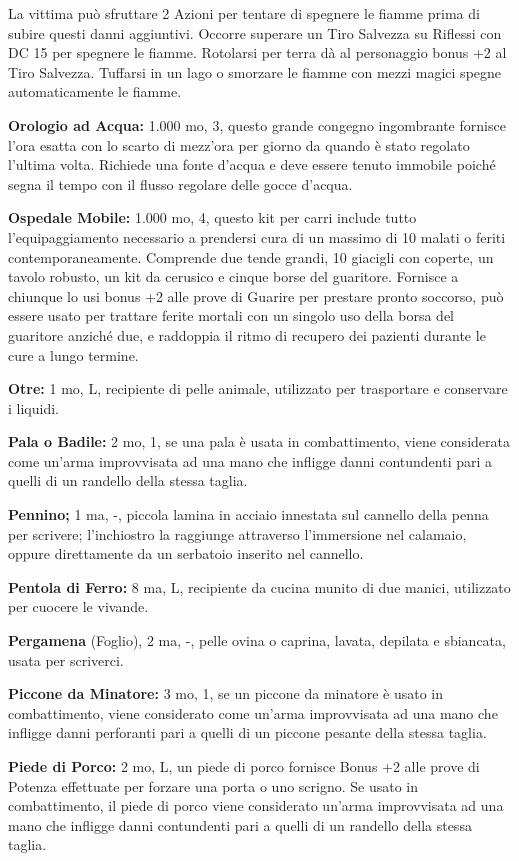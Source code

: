 \documentclass[a4paper,11pt,twoside,openany]{book}
\begin{document}
La vittima può sfruttare 2 Azioni per tentare di spegnere le fiamme prima di subire questi danni aggiuntivi. Occorre superare un Tiro Salvezza su Riflessi con DC 15 per spegnere le fiamme. Rotolarsi per terra dà al personaggio bonus +2 al Tiro Salvezza.
Tuffarsi in un lago o smorzare le fiamme con mezzi magici spegne automaticamente le fiamme.

\textbf{Orologio ad Acqua:} 1.000 mo, 3, questo grande congegno ingombrante fornisce l'ora esatta con lo scarto di mezz'ora per giorno da quando è stato regolato l'ultima volta. Richiede una fonte d'acqua e deve essere tenuto immobile poiché segna il tempo con il flusso regolare delle gocce d'acqua.

\textbf{Ospedale Mobile:} 1.000 mo, 4, questo kit per carri include tutto l'equipaggiamento necessario a prendersi cura di un massimo di 10 malati o feriti contemporaneamente. Comprende due tende grandi, 10 giacigli con coperte, un tavolo robusto, un kit da cerusico e cinque borse del guaritore. Fornisce a chiunque lo usi bonus +2 alle prove di Guarire per prestare pronto soccorso, può essere usato per trattare ferite mortali con un singolo uso della borsa del guaritore anziché due, e raddoppia il ritmo di recupero dei pazienti durante le cure a lungo termine.

\textbf{Otre:} 1 mo, L, recipiente di pelle animale, utilizzato per trasportare e conservare i liquidi.

\textbf{Pala o Badile:} 2 mo, 1, se una pala è usata in combattimento, viene considerata come un'arma improvvisata ad una mano che infligge danni contundenti pari a quelli di un randello della stessa taglia.

\textbf{Pennino;} 1 ma, -, piccola lamina in acciaio innestata sul cannello della penna per scrivere; l'inchiostro la raggiunge attraverso l'immersione nel calamaio, oppure direttamente da un serbatoio inserito nel cannello.

\textbf{Pentola di Ferro:} 8 ma, L, recipiente da cucina munito di due manici, utilizzato per cuocere le vivande.

\textbf{Pergamena} (Foglio), 2 ma, -, pelle ovina o caprina, lavata, depilata e sbiancata, usata per scriverci.

\textbf{Piccone da Minatore:} 3 mo, 1, se un piccone da minatore è usato in combattimento, viene considerato come un'arma improvvisata ad una mano che infligge danni perforanti pari a quelli di un piccone pesante della stessa taglia.

\textbf{Piede di Porco:} 2 mo, L, un piede di porco fornisce Bonus +2 alle prove di Potenza effettuate per forzare una porta o uno scrigno. Se usato in combattimento, il piede di porco viene considerato un'arma improvvisata ad una mano che infligge danni contundenti pari a quelli di un randello della stessa taglia.
\end{document}

